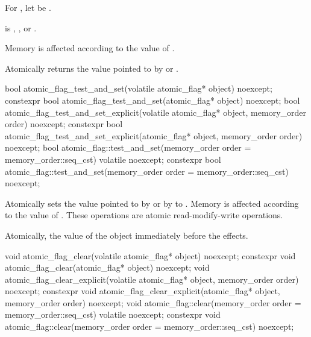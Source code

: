 \begin{itemdescr}
\pnum
For , let  be .

\pnum
\expects
{} is
,
, or
.

\pnum
\effects
Memory is affected according to the value of .

\pnum
\returns
Atomically returns the value pointed to by  or .
\end{itemdescr}

%
%
%
\begin{itemdecl}
bool atomic_flag_test_and_set(volatile atomic_flag* object) noexcept;
constexpr bool atomic_flag_test_and_set(atomic_flag* object) noexcept;
bool atomic_flag_test_and_set_explicit(volatile atomic_flag* object, memory_order order) noexcept;
constexpr bool atomic_flag_test_and_set_explicit(atomic_flag* object, memory_order order) noexcept;
bool atomic_flag::test_and_set(memory_order order = memory_order::seq_cst) volatile noexcept;
constexpr bool atomic_flag::test_and_set(memory_order order = memory_order::seq_cst) noexcept;
\end{itemdecl}

\begin{itemdescr}
\pnum
\effects
Atomically sets the value pointed to by  or by  to . Memory is affected according to the value of
. These operations are atomic read-modify-write operations.

\pnum
\returns
Atomically, the value of the object immediately before the effects.
\end{itemdescr}

%
%
%
\begin{itemdecl}
void atomic_flag_clear(volatile atomic_flag* object) noexcept;
constexpr void atomic_flag_clear(atomic_flag* object) noexcept;
void atomic_flag_clear_explicit(volatile atomic_flag* object, memory_order order) noexcept;
constexpr void atomic_flag_clear_explicit(atomic_flag* object, memory_order order) noexcept;
void atomic_flag::clear(memory_order order = memory_order::seq_cst) volatile noexcept;
constexpr void atomic_flag::clear(memory_order order = memory_order::seq_cst) noexcept;
\end{itemdecl}

